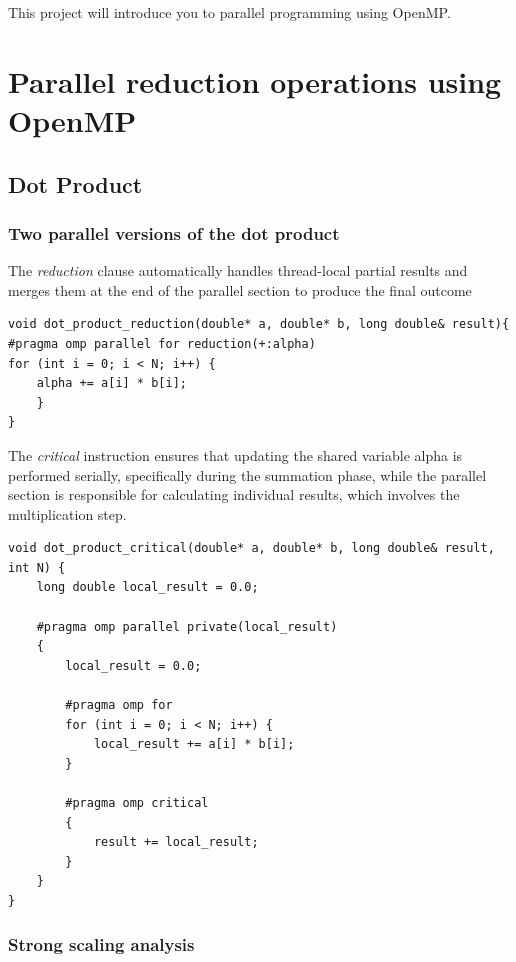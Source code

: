 \documentclass[unicode,11pt,a4paper,oneside,numbers=endperiod,openany]{scrartcl}
\begin{document}
\setassignment

\newline

\assignmentpolicy
This project will introduce you to parallel programming using OpenMP. 

\section{Parallel reduction operations using OpenMP }
\subsection{Dot Product}
\subsubsection{Two parallel versions of the dot product}
The \emph{reduction} clause automatically handles thread-local partial results and merges them at the end of the parallel section to produce the final outcome
\begin{lstlisting}[language=MyC++, style=mystyle, caption={Reduction pragma}]
void dot_product_reduction(double* a, double* b, long double& result){
#pragma omp parallel for reduction(+:alpha)
for (int i = 0; i < N; i++) {
    alpha += a[i] * b[i];
    }
}
\end{lstlisting}
The \emph{critical} instruction ensures that updating the shared variable alpha is performed serially, specifically during the summation phase, while the parallel section is responsible for calculating individual results, which involves the multiplication step.
\begin{lstlisting}[language=MyC++, style=mystyle, caption={Critical pragma}]
void dot_product_critical(double* a, double* b, long double& result, int N) {
    long double local_result = 0.0;

    #pragma omp parallel private(local_result)
    {
        local_result = 0.0;
        
        #pragma omp for
        for (int i = 0; i < N; i++) {
            local_result += a[i] * b[i];
        }

        #pragma omp critical
        {
            result += local_result;
        }
    }
}
\end{lstlisting}
\subsubsection{Strong scaling analysis}
\end{document}

